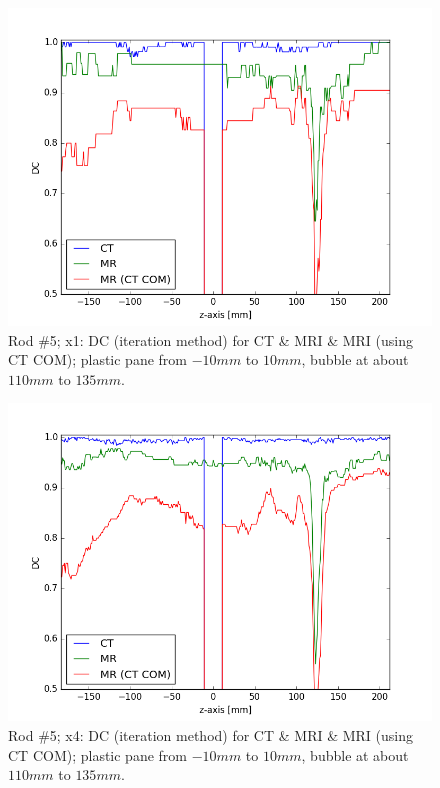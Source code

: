 \begin{figure}[!bth]
    \centering
    \includegraphics[scale=0.6]{../fig/python/ph2/dice/ph2_DC_x1_iter.png}
    \caption[Rod \#5; x1: DC (iteration method) for CT \& MRI \& MRI (using CT COM).]{Rod \#5; x1: DC (iteration method) for CT \& MRI \& MRI (using CT COM); plastic pane from $-10mm$ to $10mm$, bubble at about $110mm$ to $135mm$.}
    \label{fig:ph2_DC_x1}
\end{figure}

\begin{figure}[!bth]
    \centering
    \includegraphics[scale=0.6]{../fig/python/ph2/dice/ph2_DC_x4_iter.png}
    \caption[Rod \#5; x4: DC (iteration method) for CT \& MRI \& MRI (using CT COM).]{Rod \#5; x4: DC (iteration method) for CT \& MRI \& MRI (using CT COM); plastic pane from $-10mm$ to $10mm$, bubble at about $110mm$ to $135mm$.}
    \label{fig:ph2_DC_x4}
\end{figure}

